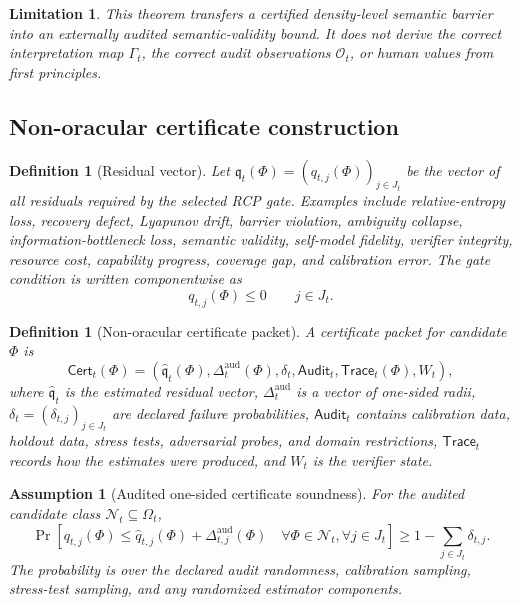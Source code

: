 \documentclass[11pt]{article}
\newtheorem{definition}[theorem]{Definition}
\newtheorem{assumption}[theorem]{Assumption}
\newtheorem{limitation}[theorem]{Limitation}
\newcommand{\1}{\mathbf{1}}
\providecommand{\Ncal}{\mathcal{N}}
\providecommand{\Ocal}{\mathcal{O}}
\begin{document}
\begin{limitation}
This theorem transfers a certified density-level semantic barrier into an externally audited semantic-validity bound.  It does not derive the correct interpretation map \(\Gamma_t\), the correct audit observations \(\Ocal_t\), or human values from first principles.
\end{limitation}

\subsection{Non-oracular certificate construction}

\begin{definition}[Residual vector]
\label{def:operational_residual_vector}
Let \(\mathfrak q_t(\Phi)=(q_{t,j}(\Phi))_{j\in J_t}\) be the vector of all residuals required by the selected RCP gate.  Examples include relative-entropy loss, recovery defect, Lyapunov drift, barrier violation, ambiguity collapse, information-bottleneck loss, semantic validity, self-model fidelity, verifier integrity, resource cost, capability progress, coverage gap, and calibration error.  The gate condition is written componentwise as
\[
q_{t,j}(\Phi)
\le0
\qquad
j\in J_t.
\]
\end{definition}

\begin{definition}[Non-oracular certificate packet]
\label{def:non_oracular_certificate_packet}
A certificate packet for candidate \(\Phi\) is
\[
\mathsf{Cert}_t(\Phi)
=
(\widehat{\mathfrak q}_t(\Phi),\Delta_t^{\mathrm{aud}}(\Phi),\delta_t,\mathsf{Audit}_t,\mathsf{Trace}_t(\Phi),W_t),
\]
where \(\widehat{\mathfrak q}_t\) is the estimated residual vector, \(\Delta_t^{\mathrm{aud}}\) is a vector of one-sided radii, \(\delta_t=(\delta_{t,j})_{j\in J_t}\) are declared failure probabilities, \(\mathsf{Audit}_t\) contains calibration data, holdout data, stress tests, adversarial probes, and domain restrictions, \(\mathsf{Trace}_t\) records how the estimates were produced, and \(W_t\) is the verifier state.
\end{definition}

\begin{assumption}[Audited one-sided certificate soundness]
\label{ass:audited_one_sided_certificate_soundness}
For the audited candidate class \(\Ncal_t\subseteq\Omega_t\),
\[
\Pr\left[
q_{t,j}(\Phi)
\le
\widehat q_{t,j}(\Phi)+\Delta_{t,j}^{\mathrm{aud}}(\Phi)
\quad
\forall \Phi\in\Ncal_t,\forall j\in J_t
\right]
\ge
1-\sum_{j\in J_t}\delta_{t,j}.
\]
The probability is over the declared audit randomness, calibration sampling, stress-test sampling, and any randomized estimator components.
\end{assumption}
\end{document}

